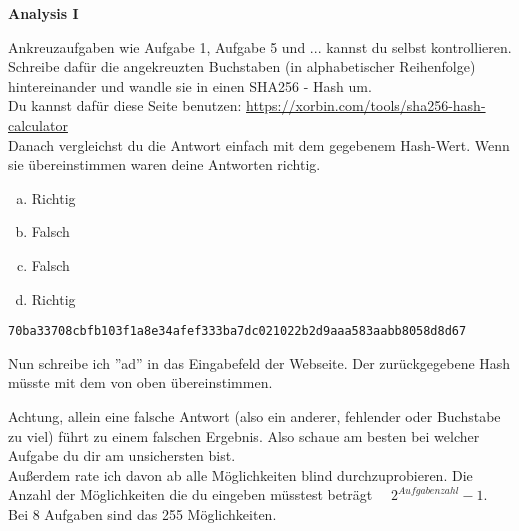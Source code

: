 \documentclass[a4paper,12pt]{article}
\newcommand{\Uebungsblatt}{Analysis I}
\newcommand{\Hinweis}[1]{
	\vspace*{0.3cm}
	\begin{tcolorbox}[breakable,colback=yellow!10,colframe=yellow!65!black,title=\textbf{Hinweis:},width=\linewidth ]
		{#1}
	\end{tcolorbox}
}
\newcommand{\SHA}[1]{
	\vspace*{0.1cm}
	\begin{tcolorbox}[breakable,colback=blue!5,colframe=blue!65!black,title=\textbf{Richtiger SHA256 Hash:},width=\linewidth ]
		{\texttt{{#1}}}
	\end{tcolorbox}
}
\newcommand{\Beispiel}[1]{
	\vspace*{0.2cm}
	\begin{tcolorbox}[breakable,colback=yellow!0,colframe=green!65!black,title=\textbf{Beispiel:},width=\linewidth ]
		{#1}
	\end{tcolorbox}
}
\begin{document}
	\thispagestyle{fancy}
	\begin{center}
		\LARGE \sf \textbf{ \Uebungsblatt{}}
	\end{center}
	\vspace*{0.1cm}
	\Hinweis{
		Ankreuzaufgaben wie Aufgabe 1, Aufgabe 5 und ... kannst du selbst kontrollieren.
		Schreibe dafür die angekreuzten Buchstaben (in alphabetischer Reihenfolge) hintereinander und wandle sie in einen SHA256 - Hash um.\\ Du kannst dafür diese Seite benutzen:
		\href{https://xorbin.com/tools/sha256-hash-calculator}{https://xorbin.com/tools/sha256-hash-calculator}\\
		Danach vergleichst du die Antwort einfach mit dem gegebenem Hash-Wert. Wenn sie übereinstimmen waren deine Antworten richtig.
		\Beispiel{
			\begin{multicols}{2}
				\begin{enumerate}[(a)]
					\item Richtig
					\item Falsch
					\item Falsch
					\item Richtig
				\end{enumerate}
			\end{multicols}
		\SHA{70ba33708cbfb103f1a8e34afef333ba7dc021022b2d9aaa583aabb8058d8d67}
			Nun schreibe ich ''ad'' in das Eingabefeld der Webseite.
			Der zurückgegebene Hash müsste mit dem von oben übereinstimmen.
		}
		Achtung, allein eine falsche Antwort (also ein anderer, fehlender oder Buchstabe zu viel) führt zu einem falschen Ergebnis. Also schaue am besten bei welcher Aufgabe du dir am unsichersten bist.\\
		Außerdem rate ich davon ab alle Möglichkeiten blind durchzuprobieren. Die Anzahl der Möglichkeiten die du eingeben müsstest beträgt $\quad 2^{Aufgabenzahl} - 1$.\\
		Bei 8 Aufgaben sind das 255 Möglichkeiten.
	}\newpage
\end{document}
